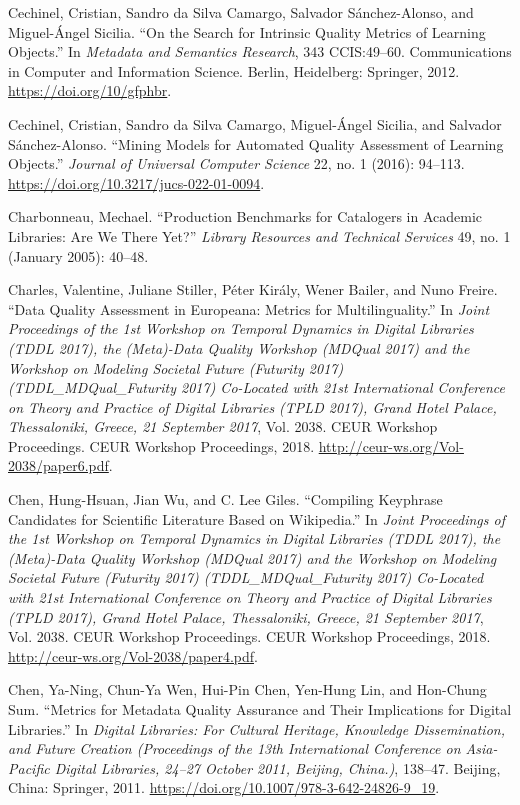 Cechinel, Cristian, Sandro da Silva Camargo, Salvador Sánchez-Alonso, and Miguel-Ángel Sicilia. “On the Search for Intrinsic Quality Metrics of Learning Objects.” In \emph{Metadata and Semantics Research}, 343 CCIS:49–60. Communications in Computer and Information Science. Berlin, Heidelberg: Springer, 2012. \url{https://doi.org/10/gfphbr}.

Cechinel, Cristian, Sandro da Silva Camargo, Miguel-Ángel Sicilia, and Salvador Sánchez-Alonso. “Mining Models for Automated Quality Assessment of Learning Objects.” \emph{Journal of Universal Computer Science} 22, no. 1 (2016): 94–113. \url{https://doi.org/10.3217/jucs-022-01-0094}.

Charbonneau, Mechael. “Production Benchmarks for Catalogers in Academic Libraries: Are We There Yet?” \emph{Library Resources and Technical Services} 49, no. 1 (January 2005): 40–48.

Charles, Valentine, Juliane Stiller, Péter Király, Wener Bailer, and Nuno Freire. “Data Quality Assessment in Europeana: Metrics for Multilinguality.” In \emph{Joint Proceedings of the 1st Workshop on Temporal Dynamics in Digital Libraries (TDDL 2017), the (Meta)-Data Quality Workshop (MDQual 2017) and the Workshop on Modeling Societal Future (Futurity 2017) (TDDL\_MDQual\_Futurity 2017) Co-Located with 21st International Conference on Theory and Practice of Digital Libraries (TPLD 2017), Grand Hotel Palace, Thessaloniki, Greece, 21 September 2017}, Vol. 2038. CEUR Workshop Proceedings. CEUR Workshop Proceedings, 2018. \url{http://ceur-ws.org/Vol-2038/paper6.pdf}.

Chen, Hung-Hsuan, Jian Wu, and C. Lee Giles. “Compiling Keyphrase Candidates for Scientific Literature Based on Wikipedia.” In \emph{Joint Proceedings of the 1st Workshop on Temporal Dynamics in Digital Libraries (TDDL 2017), the (Meta)-Data Quality Workshop (MDQual 2017) and the Workshop on Modeling Societal Future (Futurity 2017) (TDDL\_MDQual\_Futurity 2017) Co-Located with 21st International Conference on Theory and Practice of Digital Libraries (TPLD 2017), Grand Hotel Palace, Thessaloniki, Greece, 21 September 2017}, Vol. 2038. CEUR Workshop Proceedings. CEUR Workshop Proceedings, 2018. \url{http://ceur-ws.org/Vol-2038/paper4.pdf}.

Chen, Ya-Ning, Chun-Ya Wen, Hui-Pin Chen, Yen-Hung Lin, and Hon-Chung Sum. “Metrics for Metadata Quality Assurance and Their Implications for Digital Libraries.” In \emph{Digital Libraries: For Cultural Heritage, Knowledge Dissemination, and Future Creation (Proceedings of the 13th International Conference on Asia-Pacific Digital Libraries, 24–27 October 2011, Beijing, China.)}, 138–47. Beijing, China: Springer, 2011. \url{https://doi.org/10.1007/978-3-642-24826-9_19}.

